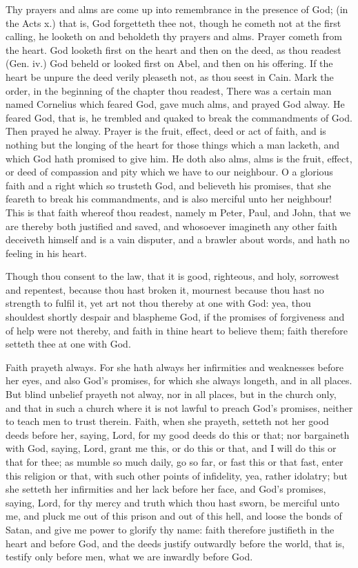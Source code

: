 Thy prayers and alms are come up into remembrance 
in the presence of God; (in the Acts x.) that is, God forgetteth
thee not, though he cometh not at the first calling, 
he looketh on and beholdeth thy prayers and alms. 
Prayer cometh from the heart. God looketh first on the 
heart and then on the deed, as thou readest (Gen. iv.) 
God beheld or looked first on Abel, and then on his offering.
If the heart be unpure the deed verily pleaseth not, 
as thou seest in Cain. Mark the order, in the beginning of 
the chapter thou readest, There was a certain man named 
Cornelius which feared God, gave much alms, and prayed 
God alway. He feared God, that is, he trembled and 
quaked to break the commandments of God. Then prayed 
he alway. Prayer is the fruit, effect, deed or act of faith, and 
is nothing but the longing of the heart for those things which 
a man lacketh, and which God hath promised to give him. 
He doth also alms, alms is the fruit, effect, or deed of compassion
and pity which we have to our neighbour. O a glorious
faith and a right which so trusteth God, and believeth 
his promises, that she feareth to break his commandments, 
and is also merciful unto her neighbour! This is that faith 
whereof thou readest, namely m Peter, Paul, and John, that 
we are thereby both justified and saved, and whosoever imagineth
any other faith deceiveth himself and is a vain disputer, 
and a brawler about words, and hath no feeling in his heart. 

Though thou consent to the law, that it is good, 
righteous, and holy, sorrowest and repentest, because thou 
hast broken it, mournest because thou hast no strength to 
fulfil it, yet art not thou thereby at one with God: yea, 
thou shouldest shortly despair and blaspheme God, if the 
promises of forgiveness and of help were not thereby, and 
faith in thine heart to believe them; faith therefore setteth
thee at one with God. 

Faith prayeth always. For she hath always her infirmities 
and weaknesses before her eyes, and also God's promises, 
for which she always longeth, and in all places. But blind 
unbelief prayeth not alway, nor in all places, but in the 
church only, and that in such a church where it is not lawful
to preach God's promises, neither to teach men to trust 
therein. Faith, when she prayeth, setteth not her good 
deeds before her, saying, Lord, for my good deeds do this 
or that; nor bargaineth with God, saying, Lord, grant me 
this, or do this or that, and I will do this or that for thee; 
as mumble so much daily, go so far, or fast this or that fast, 
enter this religion or that, with such other points of infidelity,
yea, rather idolatry; but she setteth her infirmities 
and her lack before her face, and God's promises, saying, 
Lord, for thy mercy and truth which thou hast sworn, be 
merciful unto me, and pluck me out of this prison and out of 
this hell, and loose the bonds of Satan, and give me power 
to glorify thy name: faith therefore justifieth in the heart 
and before God, and the deeds justify outwardly before 
the world, that is, testify only before men, what we are inwardly
before God. 

